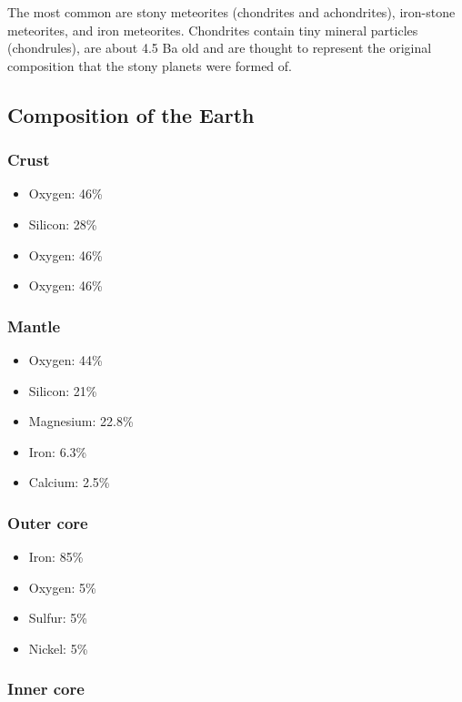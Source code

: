 The most common are stony meteorites (chondrites and achondrites), iron-stone
meteorites, and iron meteorites. Chondrites contain tiny mineral particles
(chondrules), are about 4.5 Ba old and are thought to represent the original
composition that the stony planets were formed of.

\subsection{Composition of the Earth}

\subsubsection{Crust}

\begin{itemize}
    \item Oxygen: 46\%
    \item Silicon: 28\%
    \item Oxygen: 46\%
    \item Oxygen: 46\%
\end{itemize}

\subsubsection{Mantle}

\begin{itemize}
    \item Oxygen: 44\%
    \item Silicon: 21\%
    \item Magnesium: 22.8\%
    \item Iron: 6.3\%
    \item Calcium: 2.5\%
\end{itemize}

\subsubsection{Outer core}

\begin{itemize}
    \item Iron: 85\%
    \item Oxygen: 5\%
    \item Sulfur: 5\%
    \item Nickel: 5\%
\end{itemize}

\subsubsection{Inner core}

